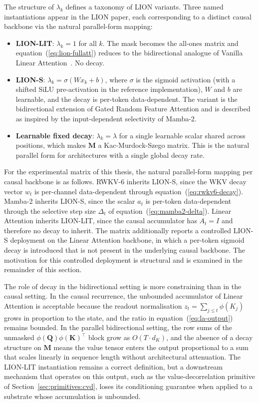 The structure of $\lambda_{k}$ defines a taxonomy of LION variants.
Three named instantiations appear in the LION paper, each
corresponding to a distinct causal backbone via the natural
parallel-form mapping:
\begin{itemize}
    \item \textbf{LION-LIT}: $\lambda_{k} = 1$ for all $k$. The mask
      becomes the all-ones matrix and
      equation~(\ref{eq:lion-fullatt}) reduces to the bidirectional
      analogue of Vanilla Linear
      Attention~\cite{katharopoulos2020transformers}. No decay.
    \item \textbf{LION-S}: $\lambda_{k} = \sigma(W x_{k} + b)$, where
      $\sigma$ is the sigmoid activation (with a shifted SiLU
      pre-activation in the reference implementation), $W$ and $b$
      are learnable, and the decay is per-token data-dependent.
      The variant is the bidirectional extension of Gated Random
      Feature Attention and is described as inspired by the
      input-dependent selectivity of Mamba-2.
    \item \textbf{Learnable fixed decay}: $\lambda_{k} = \lambda$
      for a single learnable scalar shared across positions, which
      makes $\mathbf{M}$ a Kac-Murdock-Szego matrix. This is the
      natural parallel form for architectures with a single global
      decay rate.
\end{itemize}

For the experimental matrix of this thesis, the natural parallel-form
mapping per causal backbone is as follows. RWKV-6 inherits LION-S,
since the WKV decay vector $w_{t}$ is per-channel data-dependent
through equation~(\ref{eq:rwkv6-decay}). Mamba-2 inherits LION-S,
since the scalar $a_{t}$ is per-token data-dependent through the
selective step size $\Delta_{t}$ of equation~(\ref{eq:mamba2-delta}).
Linear Attention inherits LION-LIT, since the causal accumulator has
$A_{t} = I$ and therefore no decay to inherit. The matrix
additionally reports a controlled LION-S deployment on the Linear
Attention backbone, in which a per-token sigmoid decay is introduced
that is not present in the underlying causal backbone. The motivation
for this controlled deployment is structural and is examined in the
remainder of this section.

The role of decay in the bidirectional setting is more constraining
than in the causal setting. In the causal recurrence, the unbounded
accumulator of Linear Attention is acceptable because the readout
normalisation $z_{t} = \sum_{j \le t} \phi(K_{j})$ grows in proportion
to the state, and the ratio in equation~(\ref{eq:la-output}) remains
bounded. In the parallel bidirectional setting, the row sums of the
unmasked $\phi(\mathbf{Q}) \phi(\mathbf{K})^{\top}$ block grow as
$O(T \cdot d_{K})$, and the absence of a decay structure on
$\mathbf{M}$ means the value tensor enters the output proportional to
a sum that scales linearly in sequence length without architectural
attenuation. The LION-LIT instantiation remains a correct definition,
but a downstream mechanism that operates on this output, such as the
value-decorrelation primitive of Section~\ref{sec:primitives:cvd},
loses its conditioning guarantee when applied to a substrate whose
accumulation is unbounded.

